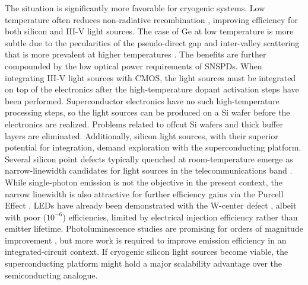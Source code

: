 \documentclass[twocolumn]{article}
\begin{document}
The situation is significantly more favorable for cryogenic systems. Low temperature often reduces non-radiative recombination \cite{gurioli1991temperature, dolores2017waveguide, sa1958}, improving efficiency for both silicon and III-V light sources. The case of Ge at low temperature is more subtle due to the pecularities of the pseudo-direct gap and inter-valley scattering that is more prevalent at higher temperatures \cite{sun2009toward}. The benefits are further compounded by the low optical power requirements of SNSPDs. When integrating III-V light sources with CMOS, the light sources must be integrated on top of the electronics after the high-temperature dopant activation steps have been performed. Superconductor electronics have no such high-temperature processing steps, so the light sources can be produced on a Si wafer before the electronics are realized. Problems related to offcut Si wafers and thick buffer layers are eliminated. Additionally, silicon light sources, with their superior potential for integration, demand exploration with the superconducting platform. Several silicon point defects typically quenched at room-temperature emerge as narrow-linewidth candidates for light sources in the telecommunications band \cite{davies1989optical,suku2014,buckley2017all,bere2018,chbe2018}. While single-photon emission \cite{hobe2020,redu2020,bech2020} is not the objective in the present context, the narrow linewidth is also attractive for further efficiency gains via the Purcell Effect \cite{romeira2018purcell}. LEDs have already been demonstrated with the W-center defect \cite{buckley2017all,bao2007point}, albeit with poor ($10^{-6}$) efficiencies, limited by electrical injection efficiency rather than emitter lifetime. Photoluminescence studies are promising for orders of magnitude improvement \cite{buckley2020optimization}, but more work is required to improve emission efficiency in an integrated-circuit context. If cryogenic silicon light sources become viable, the superconducting platform might hold a major scalability advantage over the semiconducting analogue. 
\end{document}
